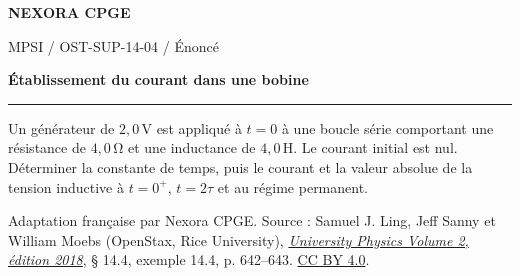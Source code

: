 \documentclass[11pt,a4paper]{article}
\begin{document}
\makeatletter
\def\@oddfoot{\footnotesize Download for free at \url{https://openstax.org/details/books/university-physics-volume-2}.\hfil\thepage}
\let\@evenfoot\@oddfoot
\makeatother
{\small\bfseries\color{nexorablue} NEXORA CPGE}\par
{\small MPSI / OST-SUP-14-04 / Énoncé}\par
{\LARGE\bfseries Établissement du courant dans une bobine}\par
\vspace{0.25em}\hrule\vspace{0.6em}

Un générateur de $2{,}0\,\mathrm V$ est appliqué à $t=0$ à une boucle série comportant une résistance de $4{,}0\,\mathrm\Omega$ et une inductance de $4{,}0\,\mathrm H$. Le courant initial est nul. Déterminer la constante de temps, puis le courant et la valeur absolue de la tension inductive à $t=0^+$, $t=2\tau$ et au régime permanent.

\bigskip
{\footnotesize Adaptation française par Nexora CPGE. Source : Samuel J. Ling, Jeff Sanny et William Moebs (OpenStax, Rice University),
\href{https://d3bxy9euw4e147.cloudfront.net/oscms-prod/media/documents/UniversityPhysicsVolume2-OP.pdf\#page=652}{\textit{University Physics Volume 2, édition 2018}}, § 14.4, exemple 14.4, p. 642–643.
\href{https://creativecommons.org/licenses/by/4.0/}{CC BY 4.0}.}
\end{document}
